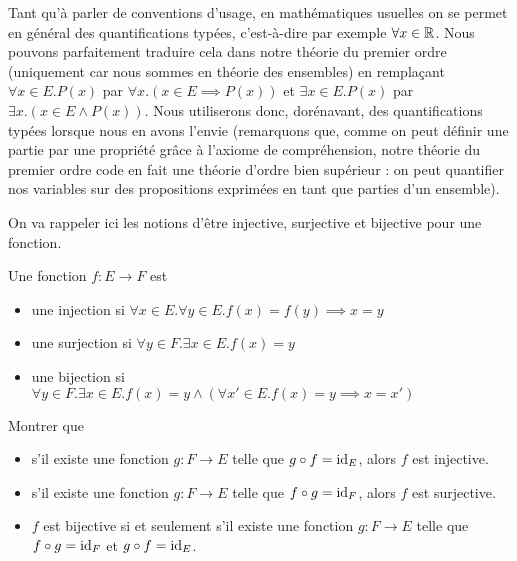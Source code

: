 \begin{rmk}
    Tant qu'à parler de conventions d'usage, en mathématiques usuelles on se permet en général des quantifications typées, c'est-à-dire par exemple $\forall x\in\mathbb{R}$. Nous pouvons parfaitement traduire cela dans notre théorie du premier ordre (uniquement car nous sommes en théorie des ensembles) en remplaçant $\forall x\in E. P(x)$ par $\forall x. (x\in E \implies P(x))$ et $\exists x\in E. P(x)$ par $\exists x.(x\in E\land P(x))$. Nous utiliserons donc, dorénavant, des quantifications typées lorsque nous en avons l'envie (remarquons que, comme on peut définir une partie par une propriété grâce à l'axiome de compréhension, notre théorie du premier ordre code en fait une théorie d'ordre bien supérieur : on peut quantifier nos variables sur des propositions exprimées en tant que parties d'un ensemble).
\end{rmk}

On va rappeler ici les notions d'être injective, surjective et bijective pour une fonction.

\begin{defi}
    Une fonction $f : E \to F$ est 
    \begin{itemize}[label=$\bullet$]
        \item une injection si $\forall x\in E.\forall y\in E.f(x)=f(y)\implies x=y$
        \item une surjection si $\forall y\in F.\exists x\in E. f(x)=y$
        \item une bijection si $\forall y\in F.\exists x\in E. f(x)=y\land (\forall x'\in E. f(x)=y\implies x=x')$
    \end{itemize}
\end{defi}

\begin{exo}
    Montrer que
    \begin{itemize}[label=$\bullet$]
        \item s'il existe une fonction $g : F\to E$ telle que $g\circ f = \mathrm{id}_E$, alors $f$ est injective.
        \item s'il existe une fonction $g : F \to E$ telle que $f\circ g = \mathrm{id}_F$, alors $f$ est surjective.
        \item $f$ est bijective si et seulement s'il existe une fonction $g : F \to E$ telle que $f\circ g = \mathrm{id}_F$ et $g\circ f = \mathrm{id}_E$.
    \end{itemize}
\end{exo}


